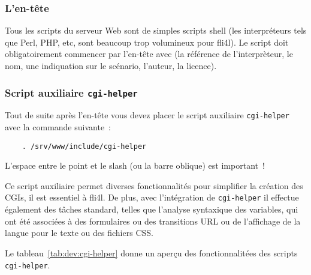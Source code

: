 \subsubsection{L'en-tête}

Tous les scripts du serveur Web sont de simples scripts shell (les interpréteurs
tels que Perl, PHP, etc, sont beaucoup trop volumineux pour fli4l). Le script doit
obligatoirement commencer par l'en-tête avec (la référence de l'interprèteur, le nom,
une indiquation sur le scénario, l'auteur, la licence).


\subsubsection{Script auxiliaire \texttt{cgi-helper}}

Tout de suite après l'en-tête vous devez placer le script auxiliaire
\texttt{cgi-helper} avec la commande suivante~:

\begin{example}
\begin{verbatim}
    . /srv/www/include/cgi-helper
\end{verbatim}
\end{example}

L'espace entre le point et le slash (ou la barre oblique) est important~!

Ce script auxiliaire permet diverses fonctionnalités pour simplifier la création
des CGIs, il est essentiel à fli4l. De plus, avec l'intégration de \texttt{cgi-helper}
il effectue également des tâches standard, telles que l'analyse syntaxique
des variables, qui ont été associées à des formulaires ou des transitions URL
ou de l'affichage de la langue pour le texte ou des fichiers CSS.

Le tableau~\ref{tab:dev:cgi-helper} donne un aperçu des fonctionnalitées des scripts
\texttt{cgi-helper}.

